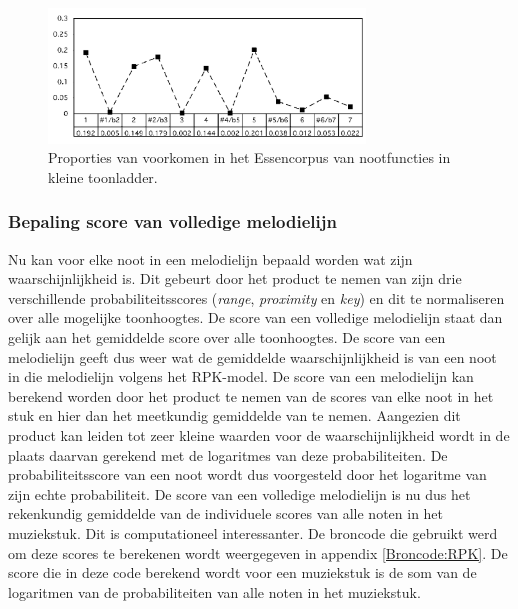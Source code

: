 \begin{figure}[!ht]
  \centering
  \includegraphics[width=0.75\textwidth]{2_Objectieve_Beoordeling/key_minor}
  \caption{Proporties van voorkomen in het Essencorpus van nootfuncties in kleine toonladder.}
  \label{figuur:key_minor}
\end{figure}

\subsubsection{Bepaling score van volledige melodielijn}
Nu kan voor elke noot in een melodielijn bepaald worden wat zijn waarschijnlijkheid is. Dit gebeurt door het product te nemen van zijn drie verschillende probabiliteitsscores (\textit{range}, \textit{proximity} en \textit{key}) en dit te normaliseren over alle mogelijke toonhoogtes. De score van een volledige melodielijn staat dan gelijk aan het gemiddelde score over alle toonhoogtes. De score van een melodielijn geeft dus weer wat de gemiddelde waarschijnlijkheid is van een noot in die melodielijn volgens het RPK-model. De score van een melodielijn kan berekend worden door het product te nemen van de scores van elke noot in het stuk en hier dan het meetkundig gemiddelde van te nemen. Aangezien dit product kan leiden tot zeer kleine waarden voor de waarschijnlijkheid wordt in de plaats daarvan gerekend met de logaritmes van deze probabiliteiten. De probabiliteitsscore van een noot wordt dus voorgesteld door het logaritme van zijn echte probabiliteit. De score van een volledige melodielijn is nu dus het rekenkundig gemiddelde van de individuele scores van alle noten in het muziekstuk. Dit is computationeel interessanter. De broncode die gebruikt werd om deze scores te berekenen wordt weergegeven in appendix \ref{Broncode:RPK}. De score die in deze code berekend wordt voor een muziekstuk is de som van de logaritmen van de probabiliteiten van alle noten in het muziekstuk.

